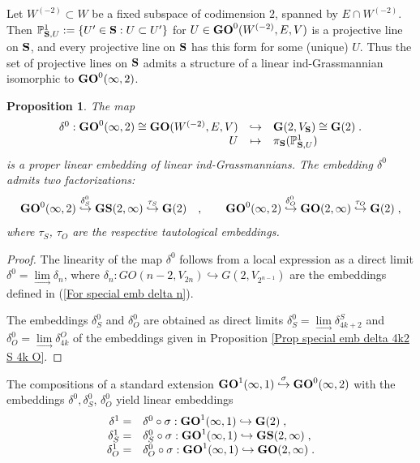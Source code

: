 \documentclass[12pt]{amsart}
\def\PP {{\mathbb P}}     %
\def\hw  {\hookrightarrow}
\newtheorem{prop}[theorem]{Proposition}
\begin{document}
Let $W^{(-2)}\subset W$ be a fixed subspace of codimension $2$, spanned by $E\cap W^{(-2)}$. Then $\PP^1_{{\bf S},U}:=\{U'\in {\bf S}:U\subset U'\}$ for $U\in {\bf GO}^0(W^{(-2)},E,V)$ is a projective line on ${\bf S}$, and every projective line on ${\bf S}$ has this form for some (unique) $U$. Thus the set of projective lines on ${\bf S}$ admits a structure of a linear ind-Grassmannian isomorphic to ${\bf GO}^0(\infty,2)$.

\begin{prop}\label{Prop Ind delta}
The map
\begin{gather*}
\begin{array}{rcl}
\delta^0 :{\bf GO}^0(\infty,2)\cong {\bf GO}(W^{(-2)},E,V) & \hookrightarrow & {\bf G}(2,V_{\bf S}) \cong {\bf G}(2) \;.\\
U & \mapsto & \pi_{\bf S}(\PP^1_{{\bf S},U})
\end{array}
\end{gather*}
is a proper linear embedding of linear ind-Grassmannians. The embedding $\delta^0$ admits two factorizations:
$$
{\bf GO}^0(\infty,2) \stackrel{\delta^0_S}{\hw} {\bf GS}(2,\infty) \stackrel{\tau_S}{\hw} {\bf G}(2) \quad,\qquad  {\bf GO}^0(\infty,2) \stackrel{\delta^0_O}{\hw} {\bf GO}(2,\infty) \stackrel{\tau_O}{\hw} {\bf G}(2) \;,
$$
where $\tau_S$, $\tau_O$ are the respective tautological embeddings.
\end{prop}

\begin{proof}
The linearity of the map $\delta^0$ follows from a local expression as a direct limit $\delta^0=\lim\limits_{\to} \delta_n$, where $\delta_n:GO(n-2,V_{2n})\hookrightarrow G(2,V_{2^{n-1}})$ are the embeddings defined in (\ref{For special emb delta n}).

The embeddings $\delta^0_S$ and $\delta^0_O$ are obtained as direct limits $\delta^0_S=\lim\limits_{\to} \delta^S_{4k+2}$ and $\delta^0_O=\lim\limits_{\to} \delta^O_{4k}$ of the embeddings given in Proposition \ref{Prop special emb delta 4k2 S 4k O}.
\end{proof}


The compositions of a standard extension ${\bf GO}^1(\infty,1) \stackrel{\sigma}{\hw} {\bf GO}^0(\infty,2)$ with the embeddings $\delta^0, \delta^0_S$, $\delta^0_O$ yield linear embeddings
\begin{gather}\label{For ind delta1}
\begin{array}{rl}
\delta^1 =& \delta^0\circ\sigma :{\bf GO}^1(\infty,1) \hookrightarrow {\bf G}(2) \;,\\
\delta^1_S =& \delta^0_S\circ\sigma :{\bf GO}^1(\infty,1) \hookrightarrow {\bf GS}(2,\infty) \;,\\
\delta^1_O =& \delta^0_O\circ\sigma :{\bf GO}^1(\infty,1) \hookrightarrow {\bf GO}(2,\infty) \;.
\end{array}
\end{gather}
\end{document}
